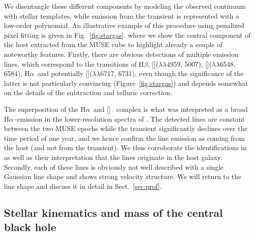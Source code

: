 \documentclass[traditabstract]{aa}
\newcommand{\hb}{H$\beta$}
\newcommand{\ha}{H$\alpha$}
\newcommand{\sii}{[\ion{S}{ii}]}
\newcommand{\oiii}{[\ion{O}{iii}]}
\newcommand{\nii}{[\ion{N}{ii}]}
\begin{document}
We disentangle these different components by modeling the observed continuum with stellar templates, while emission from the transient is represented with a low-order polynomial. An illustrative example of this procedure using penalized pixel fitting \citep[\texttt{pPXF},][]{2004PASP..116..138C, 2017MNRAS.466..798C} is given in Fig.~\ref{fig:stargas}.
where we show the central component of the host extracted from the MUSE cube to highlight already a couple of noteworthy features. Firstly, there are obvious detections of multiple emission lines, which correspond to the transitions of \hb, \oiii($\lambda\lambda$4959, 5007), \nii($\lambda\lambda$6548, 6584), \ha\, and potentially \sii($\lambda\lambda$6717, 6731), even though the significance of the latter is not particularly convincing (Figure~\ref{fig:stargas}) and depends somewhat on the details of the subtraction and telluric correction.

The superposition of the \ha~and \nii~ complex is what was interpreted as a broad \ha\,-emission in the lower-resolution spectra of \citet{2016NatAs...1E...2L}. The detected lines are constant between the two MUSE epochs while the transient significantly declines over the time period of one year, and we hence confirm the line emission as coming from the host (and not from the transient). We thus corroborate the identifications in \citet{2017ApJ...836...25M} as well as their interpretation that the lines originate in the host galaxy. Secondly, each of these lines is obviously not well described with a single Gaussian line shape and shows strong velocity structure. We will return to the line shape and discuss it in detail in Sect.~\ref{sec:prof}.

\subsection{Stellar kinematics and mass of the central black hole}
\end{document}
